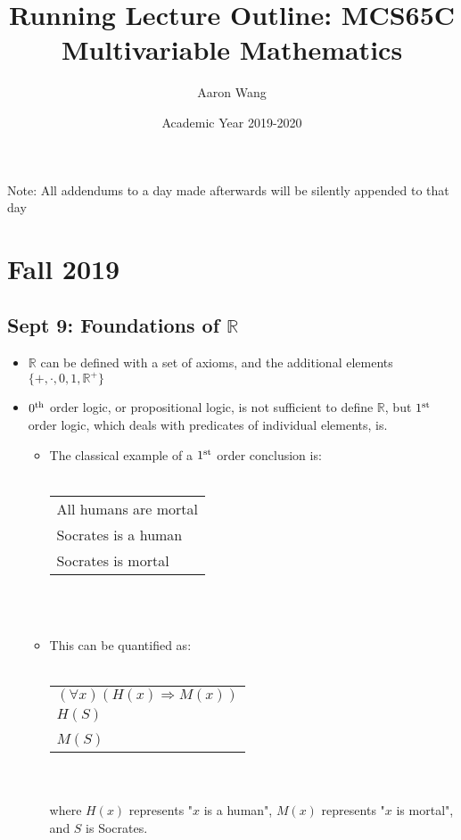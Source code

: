 \documentclass[10pt, oneside]{article}
\title{Running Lecture Outline: MCS65C Multivariable Mathematics}
\author{Aaron Wang}
\date{Academic Year 2019-2020}
\newcommand{\R}{\mathbb{R}}
\newcommand{\Cdot}{\boldsymbol{\cdot}}
\begin{document}
\maketitle
Note: All addendums to a day made afterwards will be silently appended to that day
\tableofcontents

\vspace{.25in}

\section{Fall 2019}

\subsection{Sept 9: Foundations of $\R$}
\begin{itemize}
    \item $\R$ can be defined with a set of axioms, and the additional elements $\{+,\Cdot,0,1,\R^+\}$
    \item $0^{\rm th}$ order logic, or propositional logic, is not sufficient to define $\R$, but $1^{\rm st}$ order logic, which deals with predicates of individual elements, is.
    \begin{itemize}
        \item The classical example of a $1^{\rm st}$ order conclusion is:\\
        \\
        \begin{tabular}{l}
           All humans are mortal\\
           Socrates is a human\\
           \hline Socrates is mortal\
        \end{tabular}\\\
        \item This can be quantified as:\\
        \\
        \begin{tabular}{l}
           $(\forall x)(H(x) \Rightarrow M(x))$\\
           $H(S)$\\
           \hline $M(S)$\
        \end{tabular}\\
        \\
        where $H(x)$ represents "$x$ is a human", $M(x)$ represents "$x$ is mortal", and $S$ is Socrates.
    \end{itemize}
\end{itemize}
\end{document}
